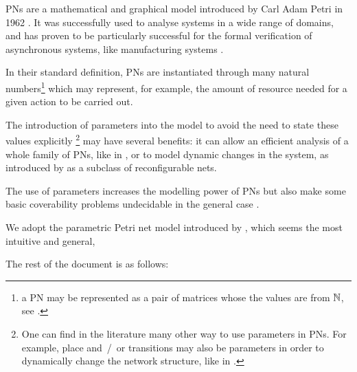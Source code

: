 \acp{PN} are a mathematical and graphical model introduced by Carl Adam Petri in 1962 \citep{Petri62,Petri66}.
It was successfully used to analyse systems in a wide range of domains, and has proven to be particularly successful for the formal verification of asynchronous systems, like manufacturing systems \cite{li2009deadlock}.

In their standard definition, \acp{PN} are instantiated through many natural numbers\footnote{\ie a \ac{PN} may be represented as a pair of matrices whose the values are from $\mathbb{N}$, see .} which may represent, for example, the amount of resource needed for a given action to be carried out.

The introduction of parameters into the model to avoid the need to state these values explicitly%
\footnote{One can find in the literature many other way to use parameters in \acp{PN}. For example, place and~/~or transitions may also be parameters in order to dynamically change the network structure, like in \cite{Christensen97}.}
may have several benefits:
it can allow an efficient analysis of a whole family of \acp{PN}, like in \cite{Abdulla13}, or to model dynamic changes in the system, as introduced by \cite{Badouel99} as a subclass of reconfigurable nets.

The use of parameters increases the modelling power of \acp{PN} but also make some basic coverability problems undecidable in the general case \cite{David17}.

We adopt the parametric Petri net model introduced by \cite{David17}, which seems the most intuitive and general, 

The rest of the document is as follows:

\acresetall

